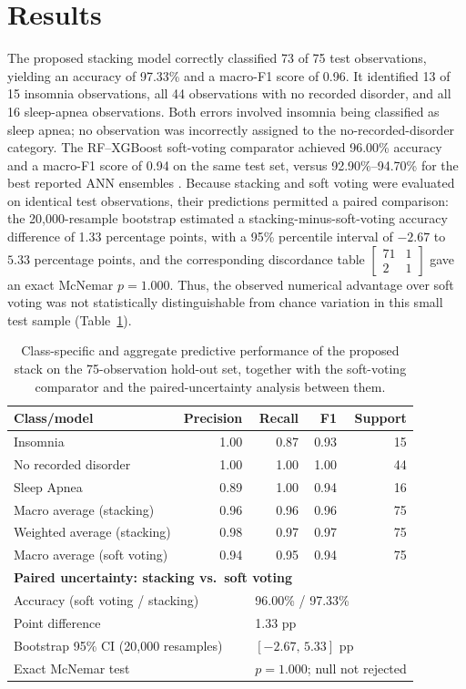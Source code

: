 \documentclass{elektr}
\begin{document}
\section{Results}
The proposed stacking model correctly classified 73 of 75 test observations, yielding an accuracy of 97.33\% and a macro-F1 score of 0.96. It identified 13 of 15 insomnia observations, all 44 observations with no recorded disorder, and all 16 sleep-apnea observations. Both errors involved insomnia being classified as sleep apnea; no observation was incorrectly assigned to the no-recorded-disorder category. The RF--XGBoost soft-voting comparator achieved 96.00\% accuracy and a macro-F1 score of 0.94 on the same test set, versus 92.90\%--94.70\% for the best reported ANN ensembles \cite{alom2024}. Because stacking and soft voting were evaluated on identical test observations, their predictions permitted a paired comparison: the 20,000-resample bootstrap estimated a stacking-minus-soft-voting accuracy difference of 1.33 percentage points, with a 95\% percentile interval of $-2.67$ to $5.33$ percentage points, and the corresponding discordance table $\begin{bmatrix}71&1\\2&1\end{bmatrix}$ gave an exact McNemar $p=1.000$. Thus, the observed numerical advantage over soft voting was not statistically distinguishable from chance variation in this small test sample (Table~\ref{tab:metrics}).

\begin{table}[H]
\centering
\caption{Class-specific and aggregate predictive performance of the proposed stack on the 75-observation hold-out set, together with the soft-voting comparator and the paired-uncertainty analysis between them.}
\label{tab:metrics}
\small
\begin{tabular}{lrrrr}
\toprule
Class/model & Precision & Recall & F1 & Support \\
\midrule
Insomnia & 1.00 & 0.87 & 0.93 & 15 \\
No recorded disorder & 1.00 & 1.00 & 1.00 & 44 \\
Sleep Apnea & 0.89 & 1.00 & 0.94 & 16 \\
Macro average (stacking) & 0.96 & 0.96 & 0.96 & 75 \\
Weighted average (stacking) & 0.98 & 0.97 & 0.97 & 75 \\
Macro average (soft voting) & 0.94 & 0.95 & 0.94 & 75 \\
\midrule
\multicolumn{5}{l}{\textbf{Paired uncertainty: stacking vs.\ soft voting}} \\
\multicolumn{2}{l}{Accuracy (soft voting / stacking)} & \multicolumn{3}{l}{96.00\% / 97.33\%} \\
\multicolumn{2}{l}{Point difference} & \multicolumn{3}{l}{1.33 pp} \\
\multicolumn{2}{l}{Bootstrap 95\% CI (20,000 resamples)} & \multicolumn{3}{l}{$[-2.67,\,5.33]$ pp} \\
\multicolumn{2}{l}{Exact McNemar test} & \multicolumn{3}{l}{$p=1.000$; null not rejected} \\
\bottomrule
\end{tabular}
\end{table}
\end{document}
